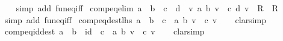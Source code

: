 \begin{isabellebody}
%
\isadelimproof
\ \ %
\endisadelimproof
%
\isatagproof
{}\isamarkupfalse%
\ {\isacharparenleft}{\kern0pt}simp\ add{\isacharcolon}{\kern0pt}\ fun{\isacharunderscore}{\kern0pt}eq{\isacharunderscore}{\kern0pt}iff{\isacharparenright}{\kern0pt}%
\endisatagproof
{\isafoldproof}%
%
\isadelimproof
\isanewline
%
\endisadelimproof
\isanewline
{}\isamarkupfalse%
\ comp{\isacharunderscore}{\kern0pt}eq{\isacharunderscore}{\kern0pt}elim{\isacharcolon}{\kern0pt}\ {\isachardoublequoteopen}a\ {\isasymcirc}\ b\ {\isacharequal}{\kern0pt}\ c\ {\isasymcirc}\ d\ {\isasymLongrightarrow}\ {\isacharparenleft}{\kern0pt}{\isacharparenleft}{\kern0pt}{\isasymAnd}v{\isachardot}{\kern0pt}\ a\ {\isacharparenleft}{\kern0pt}b\ v{\isacharparenright}{\kern0pt}\ {\isacharequal}{\kern0pt}\ c\ {\isacharparenleft}{\kern0pt}d\ v{\isacharparenright}{\kern0pt}{\isacharparenright}{\kern0pt}\ {\isasymLongrightarrow}\ R{\isacharparenright}{\kern0pt}\ {\isasymLongrightarrow}\ R{\isachardoublequoteclose}\isanewline
%
\isadelimproof
\ \ %
\endisadelimproof
%
\isatagproof
{}\isamarkupfalse%
\ {\isacharparenleft}{\kern0pt}simp\ add{\isacharcolon}{\kern0pt}\ fun{\isacharunderscore}{\kern0pt}eq{\isacharunderscore}{\kern0pt}iff{\isacharparenright}{\kern0pt}%
\endisatagproof
{\isafoldproof}%
%
\isadelimproof
\isanewline
%
\endisadelimproof
\isanewline
{}\isamarkupfalse%
\ comp{\isacharunderscore}{\kern0pt}eq{\isacharunderscore}{\kern0pt}dest{\isacharunderscore}{\kern0pt}lhs{\isacharcolon}{\kern0pt}\ {\isachardoublequoteopen}a\ {\isasymcirc}\ b\ {\isacharequal}{\kern0pt}\ c\ {\isasymLongrightarrow}\ a\ {\isacharparenleft}{\kern0pt}b\ v{\isacharparenright}{\kern0pt}\ {\isacharequal}{\kern0pt}\ c\ v{\isachardoublequoteclose}\isanewline
%
\isadelimproof
\ \ %
\endisadelimproof
%
\isatagproof
{}\isamarkupfalse%
\ clarsimp%
\endisatagproof
{\isafoldproof}%
%
\isadelimproof
\isanewline
%
\endisadelimproof
\isanewline
{}\isamarkupfalse%
\ comp{\isacharunderscore}{\kern0pt}eq{\isacharunderscore}{\kern0pt}id{\isacharunderscore}{\kern0pt}dest{\isacharcolon}{\kern0pt}\ {\isachardoublequoteopen}a\ {\isasymcirc}\ b\ {\isacharequal}{\kern0pt}\ id\ {\isasymcirc}\ c\ {\isasymLongrightarrow}\ a\ {\isacharparenleft}{\kern0pt}b\ v{\isacharparenright}{\kern0pt}\ {\isacharequal}{\kern0pt}\ c\ v{\isachardoublequoteclose}\isanewline
%
\isadelimproof
\ \ %
\endisadelimproof
%
\isatagproof
{}\isamarkupfalse%
\ clarsimp%
\endisatagproof
{\isafoldproof}%
%
\isadelimproof
\isanewline
%
\endisadelimproof
\isanewline
{}\isamarkupfalse%

\end{isabellebody}

